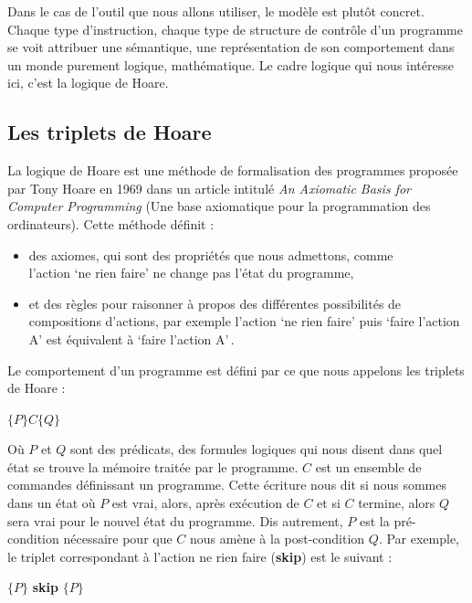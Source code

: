 \documentclass[12pt,francais,]{scrbook}
\providecommand{\tightlist}{%
  \setlength{\itemsep}{0pt}\setlength{\parskip}{0pt}}
\begin{document}
Dans le cas de l'outil que nous allons utiliser, le modèle est plutôt
concret. Chaque type d'instruction, chaque type de structure de contrôle
d'un programme se voit attribuer une sémantique, une représentation de
son comportement dans un monde purement logique, mathématique. Le cadre
logique qui nous intéresse ici, c'est la logique de Hoare.

\subsection{Les triplets de Hoare}\label{les-triplets-de-hoare}

La logique de Hoare est une méthode de formalisation des programmes
proposée par Tony Hoare en 1969 dans un article intitulé \emph{An
Axiomatic Basis for Computer Programming} (Une base axiomatique pour la
programmation des ordinateurs). Cette méthode définit :

\begin{itemize}
\tightlist
\item
  des axiomes, qui sont des propriétés que nous admettons, comme\\
  \og{}l'action `ne rien faire' ne change pas l'état du programme\fg{},
\item
  et des règles pour raisonner à propos des différentes possibilités de
  compositions d'actions, par exemple \og{}l'action `ne rien faire' puis
  `faire l'action A' est équivalent à `faire l'action A'\,\fg{}.
\end{itemize}

Le comportement d'un programme est défini par ce que nous appelons les
triplets de Hoare :

\begin{center} \(\{P\} C \{Q\}\) \end{center}

Où \(P\) et \(Q\) sont des prédicats, des formules logiques qui nous
disent dans quel état se trouve la mémoire traitée par le programme.
\(C\) est un ensemble de commandes définissant un programme. Cette
écriture nous dit \og{}si nous sommes dans un état où \(P\) est vrai,
alors, après exécution de \(C\) et si \(C\) termine, alors \(Q\) sera
vrai pour le nouvel état du programme\fg{}. Dis autrement, \(P\) est la
pré-condition nécessaire pour que \(C\) nous amène à la post-condition
\(Q\). Par exemple, le triplet correspondant à l'action \og{}ne rien
faire\fg{} (\textbf{skip}) est le suivant :

\begin{center} \(\{P\}\) \textbf{skip} \(\{P\}\) \end{center}
\end{document}
